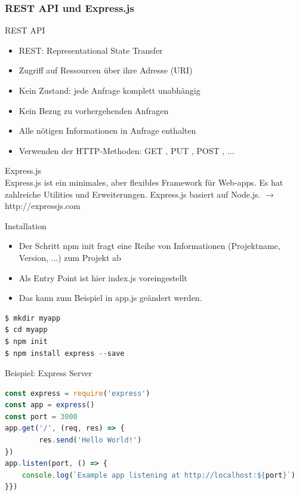 \columnbreak

\subsubsection{REST API und Express.js}

\begin{definition}{REST API}
\begin{itemize}
  \item REST: Representational State Transfer
  \item Zugriff auf Ressourcen über ihre Adresse (URI)
  \item Kein Zustand: jede Anfrage komplett unabhängig
  \item Kein Bezug zu vorhergehenden Anfragen
  \item Alle nötigen Informationen in Anfrage enthalten
  \item Verwenden der HTTP-Methoden: GET , PUT , POST , ...
\end{itemize}
\end{definition}

\begin{concept}{Express.js}\\
    Express.js ist ein minimales, aber flexibles Framework für Web-apps. Es hat zahlreiche Utilities und Erweiterungen. 
    Express.js basiert auf Node.js.
    $\rightarrow$ http://expressjs.com
\end{concept}


\begin{KR}{Installation}
\begin{itemize}
  \item Der Schritt npm init fragt eine Reihe von Informationen (Projektname, Version, ...) zum Projekt ab
  \item Als Entry Point ist hier index.js voreingestellt
  \item Das kann zum Beispiel in app.js geändert werden.
\end{itemize}
\begin{lstlisting}[language=JavaScript, style=basesmol]
$ mkdir myapp
$ cd myapp
$ npm init
$ npm install express --save
\end{lstlisting}
\end{KR}

\begin{code}{Beispiel: Express Server}
\begin{lstlisting}[language=JavaScript, style=basesmol]
const express = require('express')
const app = express()
const port = 3000
app.get('/', (req, res) => {
        res.send('Hello World!')
})
app.listen(port, () => {
    console.log(`Example app listening at http://localhost:${port}`)
}})
\end{lstlisting}
\end{code}

